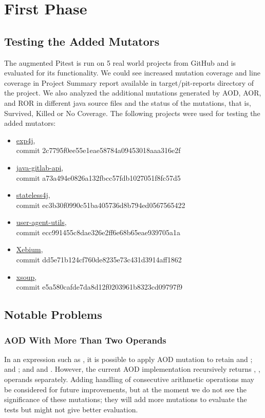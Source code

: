 \section{First Phase}





\subsection{Testing the Added Mutators}
The augmented Pitest is run on 5 real world projects from GitHub and is evaluated for its functionality.
We could see increased mutation coverage and line coverage in Project Summary report available in target/pit-reports directory of the project.
We also analyzed the additional mutations generated by AOD, AOR, and ROR in different java source files and the status of the mutations, that is, Survived, Killed or No Coverage.
The following projects were used for testing the added mutators:
\begin{itemize}
\item
  \href{https://github.com/fasseg/exp4j}{exp4j}, \\
  commit 2c7795f0ee55e1eae58784a09453018aaa316e2f
\item
  \href{https://github.com/timols/java-gitlab-api}{java-gitlab-api}, \\
  commit a73a494e0826a132fbcc57fdb1027051f8fc57d5
\item
  \href{https://github.com/oxo42/stateless4j}{stateless4j}, \\
  commit ec3b30f0990c51ba405736d8b794ed0567565422
\item
  \href{https://github.com/HaraldWalker/user-agent-utils}{user-agent-utils}, \\
  commit ecc991455c8dae326e2ff6e68b65eae939705a1a
\item
  \href{https://github.com/xebia/Xebium}{Xebium}, \\
  commit dd5e71b124cf760de8235e73c431d3914aff1862
\item
  \href{https://github.com/code4craft/xsoup}{xsoup}, \\
  commit e5a580cafde7da8d12f0203961b8323cd09797f9
\end{itemize}

\subsection{Notable Problems}
\subsubsection{AOD With More Than Two Operands}
In an expression such as , it is possible to apply AOD mutation to retain  and ;  and ; and  and .
However, the current AOD implementation recursively returns , ,  operands separately.
Adding handling of consecutive arithmetic operations may be considered for future improvements, but at the moment we do not see the significance of these mutations;
they will add more mutations to evaluate the tests but might not give better evaluation.

